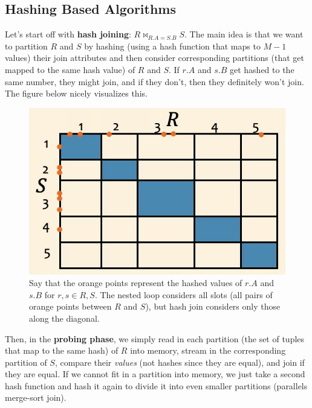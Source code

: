 \documentclass{article}
\begin{document}
  \subsection{Hashing Based Algorithms} 

    \begin{definition}
      Let's start off with \textbf{hash joining}: $R \bowtie_{R.A = S.B} S$. 
      The main idea is that we want to partition $R$ and $S$ by hashing (using a hash function that maps to $M-1$ values) their join attributes and then consider corresponding partitions (that get mapped to the same hash value) of $R$ and $S$. If $r.A$ and $s.B$ get hashed to the same number, they might join, and if they don't, then they definitely won't join. The figure below nicely visualizes this. 
    
      \begin{figure}[H]
        \centering 
        \includegraphics[scale=0.4]{img/hash_join.png}
        \caption{Say that the orange points represent the hashed values of $r.A$ and $s.B$ for $r, s \in R, S$. The nested loop considers all slots (all pairs of orange points between $R$ and $S$), but hash join considers only those along the diagonal. } 
        \label{fig:hash_join}
      \end{figure}

      Then, in the \textbf{probing phase}, we simply read in each partition (the set of tuples that map to the same hash) of $R$ into memory, stream in the corresponding partition of $S$, compare their \textit{values} (not hashes since they are equal), and join if they are equal. If we cannot fit in a partition into memory, we just take a second hash function and hash it again to divide it into even smaller partitions (parallels merge-sort join). 


\end{definition}
\end{document}
